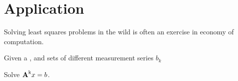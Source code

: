 \section{Application}
Solving least squares problems in the wild is often an exercise in economy of computation. 

Given a \svdl, and sets of different measurement series $b_{k}$ 

Solve $\textbf{A}^{\mathrm{k}}x=b$.

\endinput